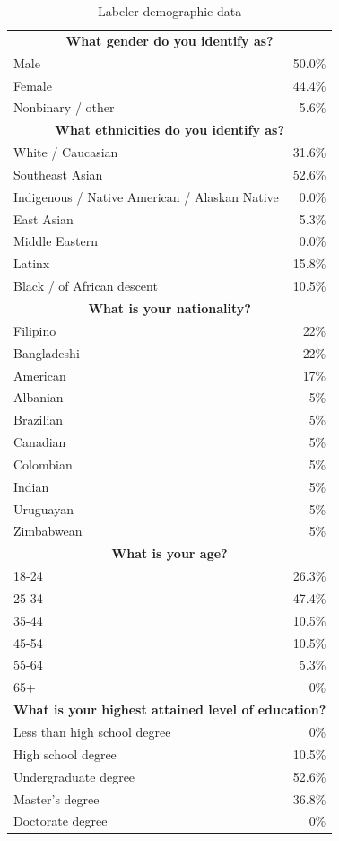 \documentclass{article}
\begin{document}
\begin{table}[]
    \centering
    \caption{Labeler demographic data}
    \label{tab:labeler_demographics}
    \begin{tabular}{l r}
    \toprule 
        \multicolumn{2}{c}{\textbf{What gender do you identify as?}}\\
         Male & 50.0\% \\
         Female & 44.4\% \\
         Nonbinary / other & 5.6\% \\ \midrule
         \multicolumn{2}{c}{\textbf{What ethnicities do you identify as?}}\\
         White / Caucasian & 31.6\% \\
         Southeast Asian & 52.6\% \\
         Indigenous / Native American / Alaskan Native  & 0.0\% \\
         East Asian & 5.3\% \\
         Middle Eastern & 0.0\% \\
         Latinx & 15.8\% \\
         Black / of African descent & 10.5\% \\ \midrule 
         \multicolumn{2}{c}{\textbf{What is your nationality?}}\\
         Filipino & 22\% \\
         Bangladeshi & 22\% \\
         American & 17\% \\
         Albanian & 5\% \\
         Brazilian & 5\% \\
         Canadian & 5\% \\
         Colombian & 5\% \\
         Indian & 5\% \\
         Uruguayan & 5\% \\
         Zimbabwean  & 5\% \\ \midrule
         \multicolumn{2}{c}{\textbf{What is your age?}}\\
         18-24 & 26.3\% \\
         25-34 & 47.4\% \\
         35-44 & 10.5\% \\
         45-54 & 10.5\% \\
         55-64 & 5.3\% \\
         65+ & 0\% \\ \midrule
         \multicolumn{2}{c}{\textbf{What is your highest attained level of education?}}\\
         Less than high school degree & 0\% \\
         High school degree & 10.5\% \\
         Undergraduate degree & 52.6\% \\
         Master's degree & 36.8\% \\
         Doctorate degree & 0\% \\
         \bottomrule
    \end{tabular}
\end{table}
\end{document}
